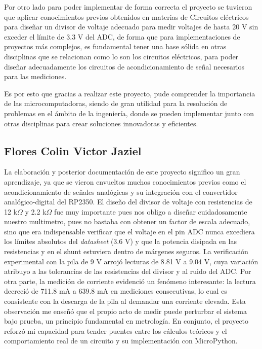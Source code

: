 \documentclass[letterpaper,12pt]{article}
\begin{document}
        Por otro lado para poder implementar de forma correcta el proyecto se tuvieron que aplicar conocimientos previos obtenidos en materias de Circuitos eléctricos para diseñar un divisor de voltaje adecuado para medir voltajes de hasta 20 V sin exceder el límite de 3.3 V del ADC, de forma que para implementaciones de proyectos más complejos, es fundamental tener una base sólida en otras disciplinas que se relacionan como lo son los circuitos eléctricos, para poder diseñar adecuadamente los circuitos de acondicionamiento de señal necesarios para las mediciones.

        Es por esto que gracias a realizar este proyecto, pude comprender la importancia de las microcomputadoras, siendo de gran utilidad para la resolución de problemas en el ámbito de la ingeniería, donde se pueden implementar junto con otras disciplinas para crear soluciones innovadoras y eficientes.


        \subsection{Flores Colin Victor Jaziel}

        La elaboración y posterior documentación de este proyecto significo un gran aprendizaje, ya que se vieron envueltos muchos conocimientos previos como el acondicionamiento de señales analógicas y su integración con el convertidor analógico-digital del RP2350. El diseño del divisor de voltaje con resistencias de 12 k$\Omega$ y 2.2 k$\Omega$ fue muy importante pues nos obligo a diseñar cuidadosamente nuestro multimetro, pues no bastaba con obtener un factor de escala adecuado, sino que era indispensable verificar que el voltaje en el pin ADC nunca excediera los límites absolutos del \textit{datasheet} (3.6 V) y que la potencia disipada en las resistencias y en el shunt estuviera dentro de márgenes seguros. La verificación experimental con la pila de 9 V arrojó lecturas de 8.81 V a 9.04 V, cuya variación atribuyo a las tolerancias de las resistencias del divisor y al ruido del ADC. Por otra parte, la medición de corriente evidenció un fenómeno interesante: la lectura decreció de 711.8 mA a 639.8 mA en mediciones consecutivas, lo cual es consistente con la descarga de la pila al demandar una corriente elevada. Esta observación me enseñó que el propio acto de medir puede perturbar el sistema bajo prueba, un principio fundamental en metrología. En conjunto, el proyecto reforzó mi capacidad para tender puentes entre los cálculos teóricos y el comportamiento real de un circuito y su implementación con MicroPython.
\end{document}
